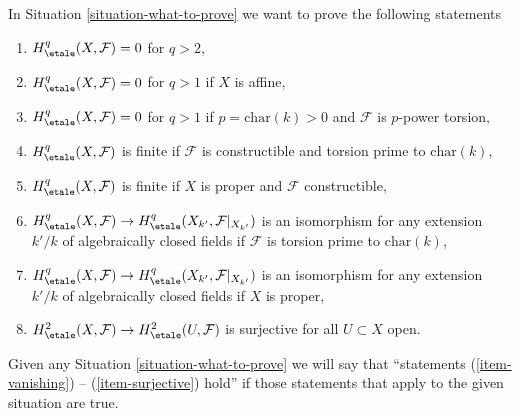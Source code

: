 \noindent
In Situation \ref{situation-what-to-prove}
we want to prove the following statements
\begin{enumerate}
\item
\label{item-vanishing}
$H^q_\etale(X, \mathcal{F}) = 0$ for $q > 2$,
\item
\label{item-vanishing-affine}
$H^q_\etale(X, \mathcal{F}) = 0$ for $q > 1$ if $X$ is affine,
\item
\label{item-vanishing-p-p}
$H^q_\etale(X, \mathcal{F}) = 0$ for $q > 1$ if $p = \text{char}(k) > 0$
and $\mathcal{F}$ is $p$-power torsion,
\item
\label{item-finite-prime-to-p}
$H^q_\etale(X, \mathcal{F})$ is finite if $\mathcal{F}$ is
constructible and torsion prime to $\text{char}(k)$,
\item
\label{item-finite-proper}
$H^q_\etale(X, \mathcal{F})$ is finite if $X$ is proper and
$\mathcal{F}$ constructible,
\item
\label{item-base-change-prime-to-p}
$H^q_\etale(X, \mathcal{F}) \to
H^q_\etale(X_{k'}, \mathcal{F}|_{X_{k'}})$ is an isomorphism
for any extension $k'/k$ of algebraically closed fields
if $\mathcal{F}$ is torsion prime to $\text{char}(k)$,
\item
\label{item-base-change-proper}
$H^q_\etale(X, \mathcal{F}) \to
H^q_\etale(X_{k'}, \mathcal{F}|_{X_{k'}})$ is an isomorphism
for any extension $k'/k$ of algebraically closed fields
if $X$ is proper,
\item
\label{item-surjective}
$H^2_\etale(X, \mathcal{F}) \to H^2_\etale(U, \mathcal{F})$
is surjective for all $U \subset X$ open.
\end{enumerate}
Given any Situation \ref{situation-what-to-prove}
we will say that
``statements (\ref{item-vanishing}) -- (\ref{item-surjective}) hold''
if those statements that apply to the given situation are true.
